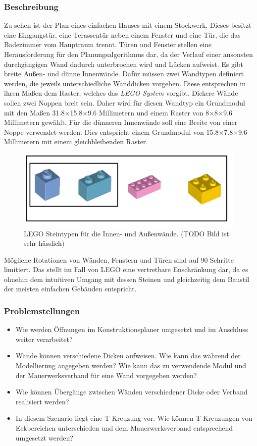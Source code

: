 \subsubsection*{Beschreibung}
Zu sehen ist der Plan eines einfachen Hauses mit einem Stockwerk.
Dieses besitzt eine Eingangstür, eine Terassentür neben einem Fenster und eine Tür, die das Badezimmer vom Hauptraum trennt.
Türen und Fenster stellen eine Herausforderung für den Planungsalgorithmus dar, da der Verlauf einer ansonsten durchgängigen Wand dadurch unterbrochen wird und Lücken aufweist.
Es gibt breite Außen- und dünne Innenwände.
Dafür müssen zwei Wandtypen definiert werden, die jeweils unterschiedliche Wanddicken vorgeben.
Diese entsprechen in ihren Maßen dem Raster, welches das \textit{LEGO System} vorgibt.
Dickere Wände sollen zwei Noppen breit sein.
Daher wird für diesen Wandtyp ein Grundmodul mit den Maßen 31.8$\times$15.8$\times$9.6 Millimetern und einem Raster von 8$\times$8$\times$9.6 Millimetern gewählt.
Für die dünneren Innenwände soll eine Breite von einer Noppe verwendet werden.
Dies entspricht einem Grundmodul von 15.8$\times$7.8$\times$9.6 Millimetern mit einem gleichbleibenden Raster.
\begin{figure}[!ht]
  \centering
  \includegraphics[width=0.6\columnwidth]{fig/scenario1_lego_set.png}
  \caption{LEGO Steintypen für die Innen- und Außenwände. (TODO Bild ist sehr hässlich)}\label{fig:scenarios:Scenario1 Lego Set}
\end{figure}
Mögliche Rotationen von Wänden, Fenstern und Türen sind auf 90\textdegree{} Schritte limitiert.
Das stellt im Fall von LEGO eine vertretbare Enschränkung dar, da es ohnehin dem intuitiven Umgang mit dessen Steinen und gleichzeitig dem Baustil der meisten einfachen Gebäuden entspricht.

\subsubsection*{Problemstellungen}
\begin{itemize}
  \item Wie werden Öffnungen im Konstruktionsplaner umgesetzt und im Anschluss weiter verarbeitet?
  \item Wände können verschiedene Dicken aufweisen. Wie kann das während der Modellierung angegeben werden? Wie kann das zu verwendende Modul und der Mauerwerksverband für eine Wand vorgegeben werden?
  \item Wie können Übergänge zwischen Wänden verschiedener Dicke oder Verband realisiert werden?
  \item In diesem Szenario liegt eine T-Kreuzung vor. Wie können T-Kreuzungen von Eckbereichen unterschieden und dem Mauerwerksverband entsprechend umgesetzt werden? 
\end{itemize}


